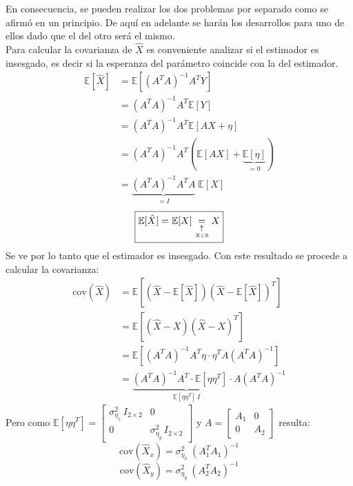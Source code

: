 	En consecuencia, se pueden realizar los dos problemas por separado como se afirmó en un principio. De aquí en adelante se harán los desarrollos para uno de ellos dado que el del otro será el mismo. \\ \indent Para calcular la covarianza de $\hat{X}$ es conveniente analizar si el estimador es insesgado, es decir si la esperanza del parámetro coincide con la del estimador.
	\begin{align*}
		\mathbb{E}[\hat{X}]&= \mathbb{E}\left[(A^T A)^{-1} A^T Y\right] \\&= (A^T A)^{-1} A^T \mathbb{E}[Y]\\
				&=(A^T A)^{-1} A^T \mathbb{E}[AX + \eta]\\ 
				&=(A^T A)^{-1} A^T (\mathbb{E}[AX] + \underbrace{\mathbb{E}[\eta]}_{=0})\\ 
				&=\underbrace{(A^T A)^{-1} A^T A}_{=I} \;\mathbb{E}[X]
	\end{align*} \begin{equation*}
		\boxed{\mathbb{E}[\hat{X}] = \mathbb{E}[X] \underuparrow{=}{X \in \mathbb{R}}X}
	\end{equation*}
	Se ve por lo tanto que el estimador es insesgado. Con este resultado se procede a calcular la covarianza:
	\begin{align*}
		\text{cov}(\hat{X})&= \mathbb{E}\left[(\hat{X}-\mathbb{E}[\hat{X}])(\hat{X}-\mathbb{E}[\hat{X}])^T\right] \\&=\mathbb{E}\left[(\hat{X}-X)(\hat{X}-X)^T\right]
		\\&=\mathbb{E}\left[(A^T A)^{-1} A^T \eta \cdot \eta^T A(A^T A)^{-1}\right]
		\\&= \underbrace{(A^T A)^{-1} A^T \cdot \mathbb{E}\left[\eta\eta^T\right]\cdot A}_{\mathbb{E}\left[\eta\eta^T\right] \, I} (A^T A)^{-1}
	\end{align*} 
\indent Pero como $\mathbb{E}\left[\eta\eta^T\right] = \begin{bmatrix}\sigma^2_{\eta_x}\, I_{2\times2}& 0 \\[0.3em] 0 & \sigma^2_{\eta_y}\, I_{2\times2}\end{bmatrix}$ y $A = \begin{bmatrix} A_1 & 0 \\[0.3em] 0 & A_2\end{bmatrix}$ resulta:
	\begin{equation*} \boxed{\text{cov}(\hat{X}_x) = \sigma^2_{\eta_x}\:(A^T_1 A_1)^{-1}} \end{equation*}
	\begin{equation*} \boxed{\text{cov}(\hat{X}_y) = \sigma^2_{\eta_y}\:(A^T_2 A_2)^{-1}} \end{equation*}

